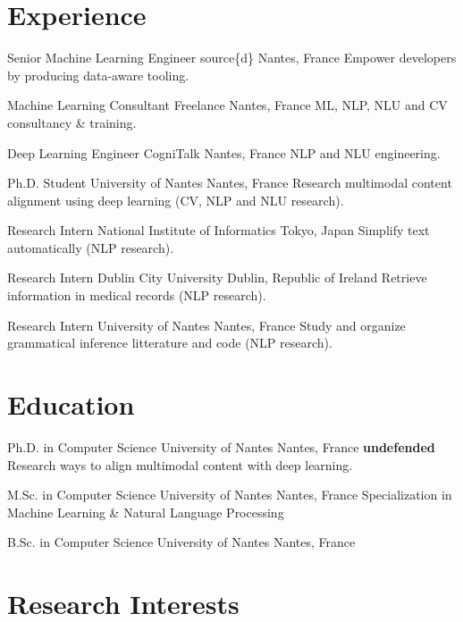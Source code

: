 \documentclass[11pt,a4paper,sans]{moderncv}        %
\begin{document}
\makecvtitle

\section{Experience}

%
{Senior Machine Learning Engineer}%
{source\{d\}}%
{Nantes, France}%
{}%
{Empower developers by producing data-aware tooling.}

%
{Machine Learning Consultant}%
{Freelance}%
{Nantes, France}%
{}%
{ML, NLP, NLU and CV consultancy \& training.}

%
{Deep Learning Engineer}%
{CogniTalk}%
{Nantes, France}%
{}%
{NLP and NLU engineering.}

%
{Ph.D. Student}%
{University of Nantes}%
{Nantes, France}%
{}%
{Research multimodal content alignment using deep learning (CV, NLP
  and NLU research).}

%
{Research Intern}%
{National Institute of Informatics}%
{Tokyo, Japan}%
{}%
{Simplify text automatically (NLP research).}

%
{Research Intern}%
{Dublin City University}%
{Dublin, Republic of Ireland}%
{}%
{Retrieve information in medical records (NLP research).}

%
{Research Intern}%
{University of Nantes}%
{Nantes, France}%
{}%
{Study and organize grammatical inference litterature and code
  (NLP research).}

\section{Education}

%
{Ph.D. in Computer Science}%
{University of Nantes}%
{Nantes, France}%
{\textbf{undefended}}%
{Research ways to align multimodal content with deep learning.}

%
{M.Sc. in Computer Science}%
{University of Nantes}%
{Nantes, France}%
{}%
{Specialization in Machine Learning \& Natural Language Processing}

%
{B.Sc. in Computer Science}%
{University of Nantes}%
{Nantes, France}%
{}%
{}

\section{Research Interests}
\end{document}
